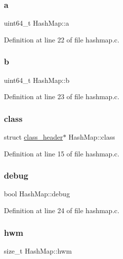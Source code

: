 \subsubsection{\texorpdfstring{a}{a}}
{\footnotesize\ttfamily uint64\+\_\+t Hash\+Map\+::a}



Definition at line 22 of file hashmap.\+c.

\mbox{\label{structHashMap_ac299cbbbb3099d161e9608669f5eb1d8}} 
\subsubsection{\texorpdfstring{b}{b}}
{\footnotesize\ttfamily uint64\+\_\+t Hash\+Map\+::b}



Definition at line 23 of file hashmap.\+c.

\mbox{\label{structHashMap_aef6bbfa93b63be380becf8acc007eeaa}} 
\subsubsection{\texorpdfstring{class}{class}}
{\footnotesize\ttfamily struct \mbox{\hyperlink{structclass__header}{class\+\_\+header}}$\ast$ Hash\+Map\+::class}



Definition at line 15 of file hashmap.\+c.

\mbox{\label{structHashMap_a9ef225abb9953fa741218d06489d06ff}} 
\subsubsection{\texorpdfstring{debug}{debug}}
{\footnotesize\ttfamily bool Hash\+Map\+::debug}



Definition at line 24 of file hashmap.\+c.

\mbox{\label{structHashMap_a6ebe07175f56adb259c8a69f0488faca}} 
\subsubsection{\texorpdfstring{hwm}{hwm}}
{\footnotesize\ttfamily size\+\_\+t Hash\+Map\+::hwm}



